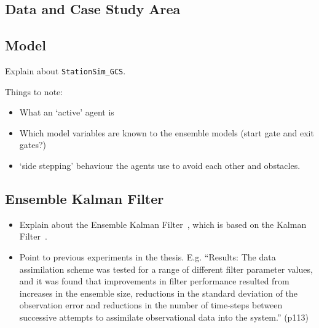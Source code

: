 \documentclass{article}
\begin{document}

\subsection{Data and Case Study Area}




\subsection{Model}\label{sub:methods:model}

Explain about \texttt{StationSim\_GCS}.

Things to note:
\begin{itemize}
  \item What an `active' agent is
  \item Which model variables are known to the ensemble models (start gate and exit gates?)  %
  \item `side stepping' behaviour the agents use to avoid each other and obstacles.
\end{itemize}

% 

\subsection{Ensemble Kalman Filter}\label{sub:methods:enkf}

\begin{itemize}
    \item Explain about the Ensemble Kalman Filter~\citep{evensen_ensemble_2003},
        which is based on the Kalman Filter~\citep{kalman_new_1960}.
    \item Point to previous experiments in the thesis. E.g. ``Results: The data assimilation scheme was tested for a range of different filter
parameter values, and it was found that improvements in filter performance
resulted from increases in the ensemble size, reductions in the standard
deviation of the observation error and reductions in the number of time-steps
between successive attempts to assimilate observational data into the system.'' (p113)
\end{itemize}
\end{document}
